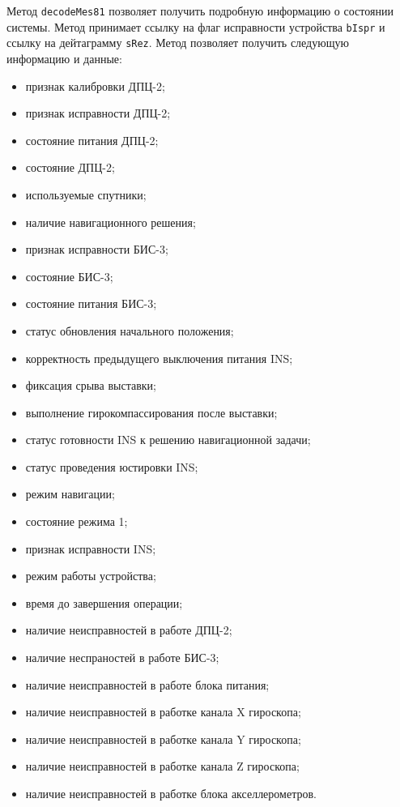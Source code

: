 \begin{enum}
	\item Метод \texttt{decodeMes81} позволяет получить подробную информацию о состоянии системы. Метод принимает
		ссылку на флаг исправности устройства \texttt{bIspr} и ссылку на дейтаграмму \texttt{sRez}.
		Метод позволяет получить следующую информацию и данные:
		\begin{itemize}
			\item признак калибровки ДПЦ-2;
			\item признак исправности ДПЦ-2;
			\item состояние питания ДПЦ-2;
			\item состояние ДПЦ-2;
			\item используемые спутники;
			\item наличие навигационного решения;
			\item признак исправности БИС-3;
			\item состояние БИС-3;
			\item состояние питания БИС-3;
			\item статус обновления начального положения;
			\item корректность предыдущего выключения питания INS;
			\item фиксация срыва выставки;
			\item выполнение гирокомпассирования после выставки;
			\item статус готовности INS к решению навигационной задачи;
			\item статус проведения юстировки INS;
			\item режим навигации;
			\item состояние режима 1;
			\item признак исправности INS;
			\item режим работы устройства;
			\item время до завершения операции;
			\item наличие неисправностей в работе ДПЦ-2;
			\item наличие неспраностей в работе БИС-3;
			\item наличие неисправностей в работе блока питания;
			\item наличие неисправностей в работке канала X гироскопа;
			\item наличие неисправностей в работке канала Y гироскопа;
			\item наличие неисправностей в работке канала Z гироскопа;
			\item наличие неисправностей в работке блока акселлерометров.
		\end{itemize}


\end{enum}

